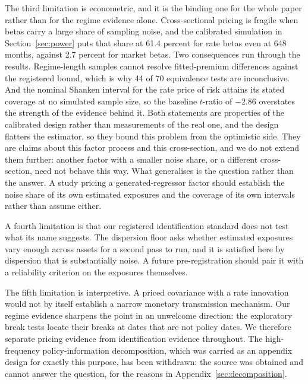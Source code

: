 \documentclass[11pt]{article}
\begin{document}
The third limitation is econometric, and it is the binding one for the whole
paper rather than for the regime evidence alone. Cross-sectional pricing is
fragile when betas carry a large share of sampling noise, and the calibrated
simulation in Section~\ref{sec:power} puts that share at 61.4 percent for rate %
betas even at 648 months, against 2.7 percent for market betas. Two consequences %
run through the results. Regime-length samples cannot resolve fitted-premium
differences against the registered bound, which is why 44 of 70 equivalence tests %
are inconclusive. And the nominal Shanken interval for the rate price of risk
attains its stated coverage at no simulated sample size, so the baseline
$t$-ratio of $-2.86$ overstates the strength of the evidence behind it. %
Both statements are properties of the calibrated design rather than measurements
of the real one, and the design flatters the estimator, so they bound this
problem from the optimistic side. They are claims about this factor process and
this cross-section, and we do not extend them further: another factor with a
smaller noise share, or a different cross-section, need not behave this way. What
generalises is the question rather than the answer. A study pricing a
generated-regressor factor should establish the noise share of its own estimated
exposures and the coverage of its own intervals rather than assume either.

A fourth limitation is that our registered identification standard does not test
what its name suggests. The dispersion floor asks whether estimated exposures
vary enough across assets for a second pass to run, and it is satisfied here by
dispersion that is substantially noise. A future pre-registration should pair it
with a reliability criterion on the exposures themselves.

The fifth limitation is interpretive. A priced covariance with a rate innovation
would not by itself establish a narrow monetary transmission mechanism. Our
regime evidence sharpens the point in an unwelcome direction: the exploratory
break tests locate their breaks at dates that are not policy dates. We therefore
separate pricing evidence from identification evidence throughout. The
high-frequency policy-information decomposition, which was carried as an appendix
design for exactly this purpose, has been withdrawn: the source was obtained and
cannot answer the question, for the reasons in
Appendix~\ref{sec:decomposition}.
\end{document}
